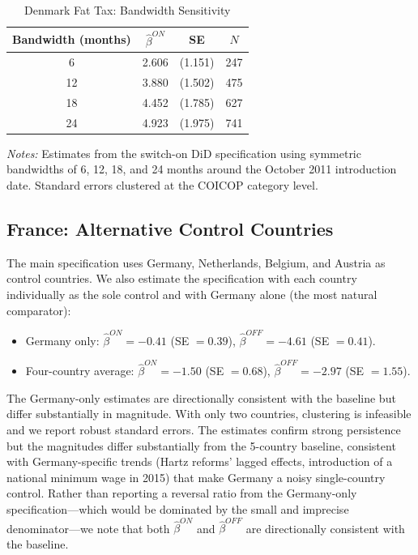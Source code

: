 \documentclass[12pt]{article}
\begin{document}
\begin{table}[H]
\centering
\caption{Denmark Fat Tax: Bandwidth Sensitivity}
\label{tab:dk_bw}
\begin{threeparttable}
\begin{tabular}{cccc}
\toprule
Bandwidth (months) & $\hat{\beta}^{ON}$ & SE & $N$ \\
\midrule
6 & 2.606 & (1.151) & 247 \\
12 & 3.880 & (1.502) & 475 \\
18 & 4.452 & (1.785) & 627 \\
24 & 4.923 & (1.975) & 741 \\
\bottomrule
\end{tabular}
\begin{tablenotes}[flushleft]
\small
\item \textit{Notes:} Estimates from the switch-on DiD specification using symmetric bandwidths of 6, 12, 18, and 24 months around the October 2011 introduction date. Standard errors clustered at the COICOP category level.
\end{tablenotes}
\end{threeparttable}
\end{table}

\subsection{France: Alternative Control Countries}

The main specification uses Germany, Netherlands, Belgium, and Austria as control countries. We also estimate the specification with each country individually as the sole control and with Germany alone (the most natural comparator):

\begin{itemize}
    \item Germany only: $\hat{\beta}^{ON} = -0.41$ (SE $= 0.39$), $\hat{\beta}^{OFF} = -4.61$ (SE $= 0.41$).
    \item Four-country average: $\hat{\beta}^{ON} = -1.50$ (SE $= 0.68$), $\hat{\beta}^{OFF} = -2.97$ (SE $= 1.55$).
\end{itemize}

The Germany-only estimates are directionally consistent with the baseline but differ substantially in magnitude. With only two countries, clustering is infeasible and we report robust standard errors. The estimates confirm strong persistence but the magnitudes differ substantially from the 5-country baseline, consistent with Germany-specific trends (Hartz reforms' lagged effects, introduction of a national minimum wage in 2015) that make Germany a noisy single-country control. Rather than reporting a reversal ratio from the Germany-only specification---which would be dominated by the small and imprecise denominator---we note that both $\hat{\beta}^{ON}$ and $\hat{\beta}^{OFF}$ are directionally consistent with the baseline.
\end{document}
